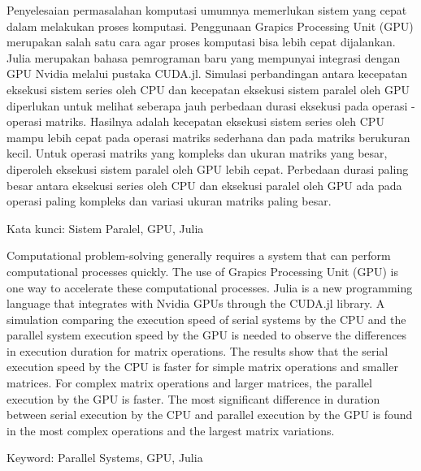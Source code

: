 \documentclass{skripsiactugm}
\begin{document}


\begin{abstractind}
	Penyelesaian permasalahan komputasi umumnya memerlukan sistem yang cepat dalam melakukan proses komputasi. Penggunaan Grapics Processing Unit (GPU) merupakan salah satu cara agar proses komputasi bisa lebih cepat dijalankan. Julia merupakan bahasa pemrograman baru yang mempunyai integrasi dengan GPU Nvidia melalui pustaka CUDA.jl. Simulasi perbandingan antara kecepatan eksekusi sistem series oleh CPU dan kecepatan eksekusi sistem paralel oleh GPU diperlukan untuk melihat seberapa jauh perbedaan durasi eksekusi pada operasi - operasi matriks. Hasilnya adalah kecepatan eksekusi sistem series oleh CPU mampu lebih cepat pada operasi matriks sederhana dan pada matriks berukuran kecil. Untuk operasi matriks yang kompleks dan ukuran matriks yang besar, diperoleh eksekusi sistem paralel oleh GPU lebih cepat. Perbedaan durasi paling besar antara eksekusi series oleh CPU dan eksekusi paralel oleh GPU ada pada operasi paling kompleks dan variasi ukuran matriks paling besar.


	Kata kunci: Sistem Paralel, GPU, Julia
\end{abstractind}

\begin{abstracteng}
	Computational problem-solving generally requires a system that can perform computational processes quickly. The use of Grapics Processing Unit (GPU) is one way to accelerate these computational processes. Julia is a new programming language that integrates with Nvidia GPUs through the CUDA.jl library. A simulation comparing the execution speed of serial systems by the CPU and the parallel system execution speed by the GPU is needed to observe the differences in execution duration for matrix operations. The results show that the serial execution speed by the CPU is faster for simple matrix operations and smaller matrices. For complex matrix operations and larger matrices, the parallel execution by the GPU is faster. The most significant difference in duration between serial execution by the CPU and parallel execution by the GPU is found in the most complex operations and the largest matrix variations.

	Keyword: Parallel Systems, GPU, Julia
\end{abstracteng}
\end{document}
